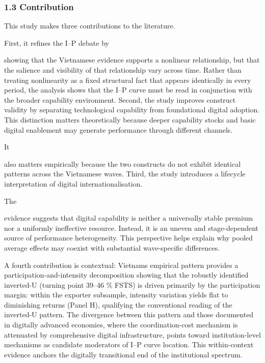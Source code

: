 \documentclass[12pt,a4paper]{article}
\begin{document}
\hypertarget{13-contribution}{%
\subsubsection{1.3 Contribution}\label{13-contribution}}

This study makes three contributions to the literature.

First, it refines the I--P debate by

showing that the Vietnamese evidence supports a nonlinear relationship,
but that the salience and visibility of that relationship vary across
time. Rather than treating nonlinearity as a fixed structural fact that
appears identically in every period, the analysis shows that the I--P
curve must be read in conjunction with the broader capability
environment. Second, the study improves construct validity by separating
technological capability from foundational digital adoption. This
distinction matters theoretically because deeper capability stocks and
basic digital enablement may generate performance through different
channels.

It

also matters empirically because the two constructs do not exhibit
identical patterns across the Vietnamese waves. Third, the study
introduces a lifecycle interpretation of digital internationalisation.

The

evidence suggests that digital capability is neither a universally
stable premium nor a uniformly ineffective resource. Instead, it is an
uneven and stage-dependent source of performance heterogeneity. This
perspective helps explain why pooled average effects may coexist with
substantial wave-specific differences.

A fourth contribution is contextual: Vietnam\textquotesingle s empirical
pattern provides a participation-and-intensity decomposition showing
that the robustly identified inverted-U (turning point 39--46 \% FSTS)
is driven primarily by the participation margin: within the exporter
subsample, intensity variation yields flat to diminishing returns (Panel
H), qualifying the conventional reading of the inverted-U pattern. The
divergence between this pattern and those documented in digitally
advanced economies, where the coordination-cost mechanism is attenuated
by comprehensive digital infrastructure, points toward institution-level
mechanisms as candidate moderators of I--P curve location. This
within-context evidence anchors the digitally transitional end of the
institutional spectrum.
\end{document}
